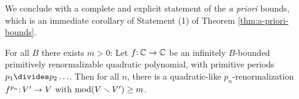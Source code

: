 We conclude with a complete and explicit statement of the \emph{a priori} bounds,
which is an immediate corollary of Statement (1) of Theorem \ref{thm:a-priori-bounds}.
\begin{theorem}
For all $B$ there exists $m > 0$:
Let $f\mathpunct: {\Bbb C}\to {\Bbb C}$ be an infinitely $B$-bounded primitively renormalizable quadratic polynomial,
with primitive periods $p_1 \divides p_2 \ldots$. 
Then for all $n$, there is a quadratic-like $p_n$-renormalization $f^{p_n}\mathpunct: V' \to V$ with $\operatorname{mod}(V \smallsetminus V') \ge m$. 
\end{theorem}
 
